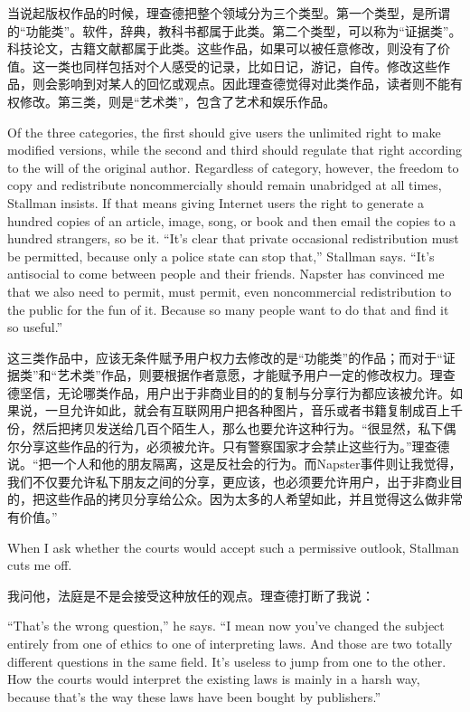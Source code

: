 \ifdefined\chs
当说起版权作品的时候，理查德把整个领域分为三个类型。第一个类型，是所谓的“功能类”。软件，辞典，教科书都属于此类。第二个类型，可以称为“证据类”。科技论文，古籍文献都属于此类。这些作品，如果可以被任意修改，则没有了价值。这一类也同样包括对个人感受的记录，比如日记，游记，自传。修改这些作品，则会影响到对某人的回忆或观点。因此理查德觉得对此类作品，读者则不能有权修改。第三类，则是“艺术类”，包含了艺术和娱乐作品。
\fi

\ifdefined\eng
Of the three categories, the first should give users the unlimited right to make modified versions, while the second and third should regulate that right according to the will of the original author. Regardless of category, however, the freedom to copy and redistribute noncommercially should remain unabridged at all times, Stallman insists. If that means giving Internet users the right to generate a hundred copies of an article, image, song, or book and then email the copies to a hundred strangers, so be it. ``It's clear that private occasional redistribution must be permitted, because only a police state can stop that,'' Stallman says. ``It's antisocial to come between people and their friends. Napster has convinced me that we also need to permit, must permit, even noncommercial redistribution to the public for the fun of it. Because so many people want to do that and find it so useful.''
\fi

\ifdefined\chs
这三类作品中，应该无条件赋予用户权力去修改的是“功能类”的作品；而对于“证据类”和“艺术类”作品，则要根据作者意愿，才能赋予用户一定的修改权力。理查德坚信，无论哪类作品，用户出于非商业目的的复制与分享行为都应该被允许。如果说，一旦允许如此，就会有互联网用户把各种图片，音乐或者书籍复制成百上千份，然后把拷贝发送给几百个陌生人，那么也要允许这种行为。“很显然，私下偶尔分享这些作品的行为，必须被允许。只有警察国家才会禁止这些行为。”理查德说。“把一个人和他的朋友隔离，这是反社会的行为。而Napster事件则让我觉得，我们不仅要允许私下朋友之间的分享，更应该，也必须要允许用户，出于非商业目的，把这些作品的拷贝分享给公众。因为太多的人希望如此，并且觉得这么做非常有价值。”
\fi

\ifdefined\eng
When I ask whether the courts would accept such a permissive outlook, Stallman cuts me off.
\fi

\ifdefined\chs
我问他，法庭是不是会接受这种放任的观点。理查德打断了我说：
\fi

\ifdefined\eng
``That's the wrong question,'' he says. ``I mean now you've changed the subject entirely from one of ethics to one of interpreting laws. And those are two totally different questions in the same field. It's useless to jump from one to the other. How the courts would interpret the existing laws is mainly in a harsh way, because that's the way these laws have been bought by publishers.''
\fi

